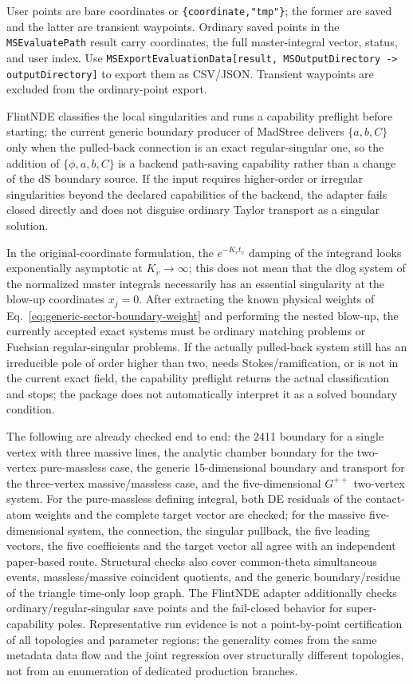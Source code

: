 \documentclass[11pt,a4paper]{article}
\begin{document}
User points are bare coordinates or \texttt{\{coordinate,"tmp"\}}; the former are saved and
the latter are transient waypoints. Ordinary saved points in the \texttt{MSEvaluatePath} result
carry coordinates, the full master-integral vector, status, and user index. Use
\texttt{MSExportEvaluationData[result, MSOutputDirectory -> outputDirectory]} to export
them as CSV/JSON. Transient waypoints are excluded from the ordinary-point export.

FlintNDE classifies the local singularities and runs a capability preflight before starting; the current generic boundary producer of MadStree delivers $\{a,b,C\}$ only when the pulled-back connection is an exact regular-singular one, so the addition of $\{\phi,a,b,C\}$ is a backend path-saving capability rather than a change of the dS boundary source. If the input requires higher-order or irregular singularities beyond the declared capabilities of the backend, the adapter fails closed directly and does not disguise ordinary Taylor transport as a singular solution.

In the original-coordinate formulation, the $e^{-K_vt_v}$ damping of the integrand looks exponentially asymptotic at $K_v\to\infty$; this does not mean that the dlog system of the normalized master integrals necessarily has an essential singularity at the blow-up coordinates $x_j=0$. After extracting the known physical weights of Eq.~\eqref{eq:generic-sector-boundary-weight} and performing the nested blow-up, the currently accepted exact systems must be ordinary matching problems or Fuchsian regular-singular problems. If the actually pulled-back system still has an irreducible pole of order higher than two, needs Stokes/ramification, or is not in the current exact field, the capability preflight returns the actual classification and stops; the package does not automatically interpret it as a solved boundary condition.

The following are already checked end to end: the 2411 boundary for a single vertex with three massive lines, the analytic chamber boundary for the two-vertex pure-massless case, the generic 15-dimensional boundary and transport for the three-vertex massive/massless case, and the five-dimensional $G^{++}$ two-vertex system. For the pure-massless defining integral, both DE residuals of the contact-atom weights and the complete target vector are checked; for the massive five-dimensional system, the connection, the singular pullback, the five leading vectors, the five coefficients and the target vector all agree with an independent paper-based route. Structural checks also cover common-theta simultaneous events, massless/massive coincident quotients, and the generic boundary/residue of the triangle time-only loop graph. The FlintNDE adapter additionally checks ordinary/regular-singular save points and the fail-closed behavior for super-capability poles. Representative run evidence is not a point-by-point certification of all topologies and parameter regions; the generality comes from the same metadata data flow and the joint regression over structurally different topologies, not from an enumeration of dedicated production branches.
\end{document}
